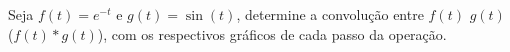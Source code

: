 \linespread{1.5}
Seja $f(t) = e^{-t}$ e $g(t) = \sin{(t)}$, determine a convolução entre $f(t)$ $g(t)$ ($f(t)\ast g(t)$), com os respectivos gráficos de cada passo da operação.